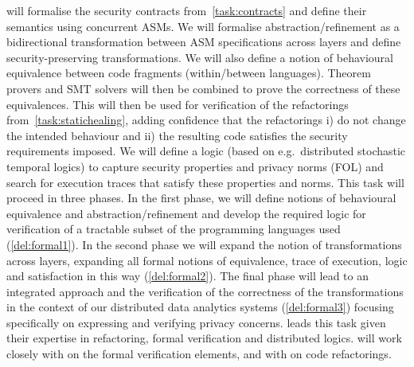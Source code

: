 \begin{Workpackage}{\thewpno}
\begin{Task}
\theTask{} will formalise the security contracts from~\ref{task:contracts} and define their semantics using concurrent ASMs. We will formalise abstraction/refinement as a bidirectional transformation between ASM specifications across layers and define security-preserving transformations. We will also define a notion of behavioural equivalence between code fragments (within/between languages).
\taskbreak
Theorem provers and SMT solvers will then be combined to prove the correctness of these equivalences. 
This will then be used for verification of the refactorings from~\ref{task:statichealing}, adding confidence that the refactorings i) do not change the intended behaviour and ii) the resulting code satisfies the security requirements imposed. 
We will define a logic (based on e.g.~distributed stochastic temporal logics) to capture security properties and privacy norms (FOL) and search for execution traces that satisfy these properties and norms. This task will proceed in three phases. In the first phase, we will define notions of behavioural equivalence and abstraction/refinement and develop the required logic for verification of a tractable subset of the programming languages used (\ref{del:formal1}). In the second phase we will expand the notion of transformations across layers, expanding all formal notions of equivalence, trace of execution, logic and satisfaction in this way  (\ref{del:formal2}). The final phase will lead to an integrated approach and the verification of the correctness of the transformations in the context of our distributed data analytics systems (\ref{del:formal3}) focusing specifically on expressing and verifying privacy concerns.
\SA leads this task given their expertise in refactoring, formal verification and distributed logics. \SA will work closely with \SCCHshort on the formal verification elements, and with \UCM on code refactorings.

\end{Task}


\end{Workpackage}
